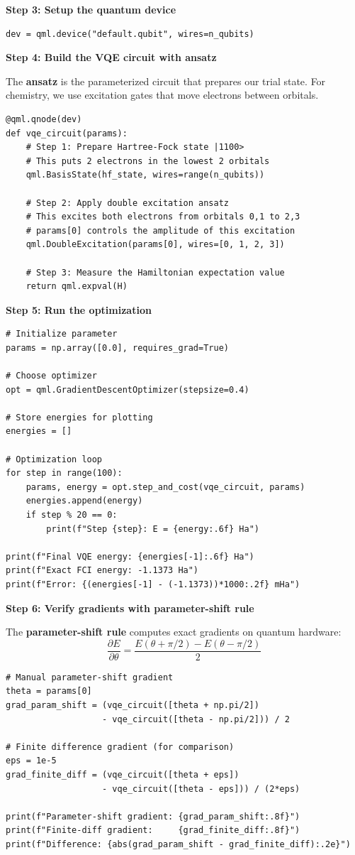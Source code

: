 \documentclass[11pt,a4paper]{article}
\begin{document}
\textbf{Step 3: Setup the quantum device}
\begin{lstlisting}
dev = qml.device("default.qubit", wires=n_qubits)
\end{lstlisting}

\textbf{Step 4: Build the VQE circuit with ansatz}

The \textbf{ansatz} is the parameterized circuit that prepares our trial state. For chemistry, we use excitation gates that move electrons between orbitals.
\begin{lstlisting}
@qml.qnode(dev)
def vqe_circuit(params):
    # Step 1: Prepare Hartree-Fock state |1100>
    # This puts 2 electrons in the lowest 2 orbitals
    qml.BasisState(hf_state, wires=range(n_qubits))
    
    # Step 2: Apply double excitation ansatz
    # This excites both electrons from orbitals 0,1 to 2,3
    # params[0] controls the amplitude of this excitation
    qml.DoubleExcitation(params[0], wires=[0, 1, 2, 3])
    
    # Step 3: Measure the Hamiltonian expectation value
    return qml.expval(H)
\end{lstlisting}

\textbf{Step 5: Run the optimization}
\begin{lstlisting}
# Initialize parameter
params = np.array([0.0], requires_grad=True)

# Choose optimizer
opt = qml.GradientDescentOptimizer(stepsize=0.4)

# Store energies for plotting
energies = []

# Optimization loop
for step in range(100):
    params, energy = opt.step_and_cost(vqe_circuit, params)
    energies.append(energy)
    if step % 20 == 0:
        print(f"Step {step}: E = {energy:.6f} Ha")

print(f"Final VQE energy: {energies[-1]:.6f} Ha")
print(f"Exact FCI energy: -1.1373 Ha")
print(f"Error: {(energies[-1] - (-1.1373))*1000:.2f} mHa")
\end{lstlisting}

\textbf{Step 6: Verify gradients with parameter-shift rule}

The \textbf{parameter-shift rule} computes exact gradients on quantum hardware:
\[
\frac{\partial E}{\partial \theta} = \frac{E(\theta + \pi/2) - E(\theta - \pi/2)}{2}
\]
\begin{lstlisting}
# Manual parameter-shift gradient
theta = params[0]
grad_param_shift = (vqe_circuit([theta + np.pi/2]) 
                   - vqe_circuit([theta - np.pi/2])) / 2

# Finite difference gradient (for comparison)
eps = 1e-5
grad_finite_diff = (vqe_circuit([theta + eps]) 
                   - vqe_circuit([theta - eps])) / (2*eps)

print(f"Parameter-shift gradient: {grad_param_shift:.8f}")
print(f"Finite-diff gradient:     {grad_finite_diff:.8f}")
print(f"Difference: {abs(grad_param_shift - grad_finite_diff):.2e}")
\end{lstlisting}
\end{document}
